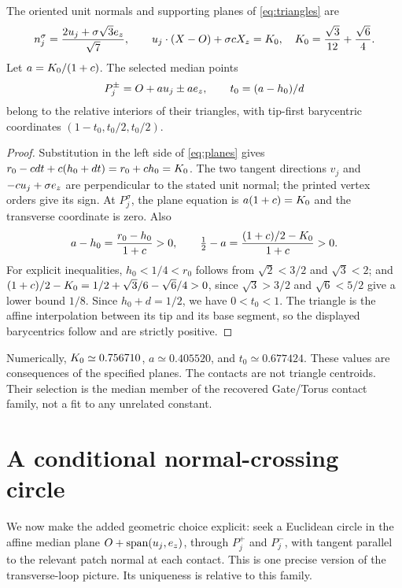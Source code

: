 \begin{proposition}\label{prop:contacts}
The oriented unit normals and supporting planes of \eqref{eq:triangles} are
\begin{equation}\label{eq:planes}
n_j^\sigma=\frac{2u_j+\sigma\sqrt3e_z}{\sqrt7},\qquad
u_j\cdot(X-O)+\sigma cX_z=K_0,\quad
K_0=\frac{\sqrt3}{12}+\frac{\sqrt6}{4}.
\end{equation}
Let $a=K_0/(1+c)$. The selected median points
\begin{equation}\label{eq:contacts}
P_j^\pm=O+a u_j\pm ae_z,\qquad t_0=(a-h_0)/d
\end{equation}
belong to the relative interiors of their triangles, with tip-first barycentric coordinates $(1-t_0,t_0/2,t_0/2)$.
\end{proposition}
\begin{proof}
Substitution in the left side of \eqref{eq:planes} gives $r_0-cdt+c(h_0+dt)=r_0+ch_0=K_0$. The two tangent directions $v_j$ and $-c u_j+\sigma e_z$ are perpendicular to the stated unit normal; the printed vertex orders give its sign. At $P_j^\sigma$, the plane equation is $a(1+c)=K_0$ and the transverse coordinate is zero. Also
\[
a-h_0=\frac{r_0-h_0}{1+c}>0,\qquad
\tfrac12-a=\frac{(1+c)/2-K_0}{1+c}>0.
\]
For explicit inequalities, $h_0<1/4<r_0$ follows from $\sqrt2<3/2$ and $\sqrt3<2$; and $(1+c)/2-K_0=1/2+\sqrt3/6-\sqrt6/4>0$, since $\sqrt3>3/2$ and $\sqrt6<5/2$ give a lower bound $1/8$. Since $h_0+d=1/2$, we have $0<t_0<1$. The triangle is the affine interpolation between its tip and its base segment, so the displayed barycentrics follow and are strictly positive.
\end{proof}

Numerically, $K_0\simeq0.756710$, $a\simeq0.405520$, and $t_0\simeq0.677424$. These values are consequences of the specified planes. The contacts are not triangle centroids. Their selection is the median member of the recovered Gate/Torus contact family, not a fit to any unrelated constant.~\cite[Sec.~3.3]{Gate}

\section{A conditional normal-crossing circle}\label{sec:circle}
We now make the added geometric choice explicit: seek a Euclidean circle in the affine median plane $O+\operatorname{span}(u_j,e_z)$, through $P_j^+$ and $P_j^-$, with tangent parallel to the relevant patch normal at each contact. This is one precise version of the transverse-loop picture. Its uniqueness is relative to this family.

